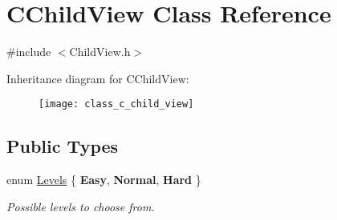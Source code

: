 \hypertarget{class_c_child_view}{}\section{C\+Child\+View Class Reference}
\label{class_c_child_view}


{\ttfamily \#include $<$Child\+View.\+h$>$}

Inheritance diagram for C\+Child\+View\+:\begin{figure}[H]
\begin{center}
\leavevmode
\texttt{[image: class\_c\_child\_view]}
\end{center}
\end{figure}
\subsection*{Public Types}
\begin{DoxyCompactItemize}
\item 
\mbox{\label{class_c_child_view_a581600c4abfff94f3da324f4c2724e0a}} 
enum \mbox{\hyperlink{class_c_child_view_a581600c4abfff94f3da324f4c2724e0a}{Levels}} \{ {\bfseries Easy}, 
{\bfseries Normal}, 
{\bfseries Hard}
 \}
\begin{DoxyCompactList}\small\item\em Possible levels to choose from. \end{DoxyCompactList}\end{DoxyCompactItemize}
